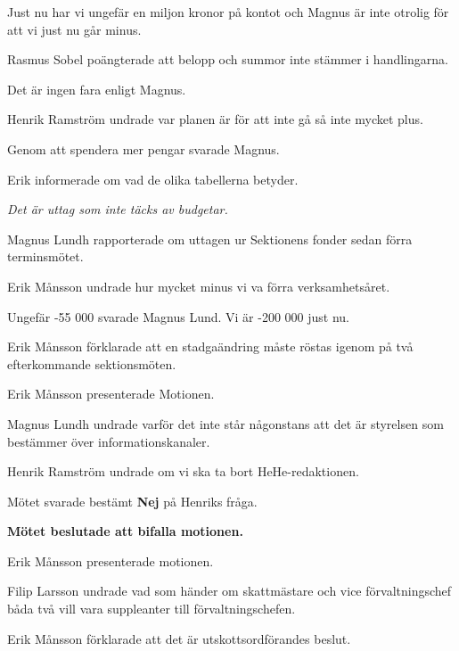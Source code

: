 \documentclass[10pt]{article}
\begin{document}
\begin{paragrafer}
Just nu har vi ungefär en miljon kronor på kontot och Magnus är inte otrolig för att vi just nu går minus.

Rasmus Sobel poängterade att belopp och summor inte stämmer i handlingarna. 

Det är ingen fara enligt Magnus.

Henrik Ramström undrade var planen är för att inte gå så inte mycket plus. 

Genom att spendera mer pengar svarade Magnus.


Erik informerade om vad de olika tabellerna betyder. 

\emph{Det är uttag som inte täcks av budgetar.}

Magnus Lundh rapporterade om uttagen ur Sektionens fonder sedan förra terminsmötet.


Erik Månsson undrade hur mycket minus vi va förra verksamhetsåret. 

Ungefär -55 000 svarade Magnus Lund. Vi är -200 000 just nu.

    \begin{paragrafer}

		Erik Månsson förklarade att en stadgaändring måste röstas igenom på två efterkommande sektionsmöten.

		Erik Månsson presenterade Motionen. 

		Magnus Lundh undrade varför det inte står någonstans att det är styrelsen som bestämmer över informationskanaler. 

		Henrik Ramström undrade om vi ska ta bort HeHe-redaktionen.

		Mötet svarade bestämt \textbf{Nej} på Henriks fråga.

		\textbf{Mötet beslutade att bifalla motionen.}

		
		Erik Månsson presenterade motionen.

		Filip Larsson undrade vad som händer om skattmästare och vice förvaltningschef båda två vill vara suppleanter till förvaltningschefen. 

		Erik Månsson förklarade att det är utskottsordförandes beslut.


\end{paragrafer}
\end{paragrafer}
\end{document}
